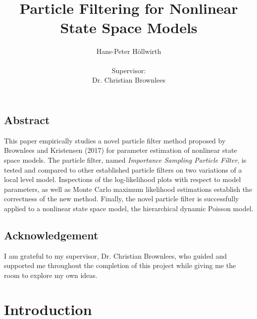 \documentclass[11pt, oneside]{scrreprt}   	%
\title{\textit{}\\\textit{}\\Particle Filtering for Nonlinear\\ State Space Models}
\author{Hans-Peter H{\"o}llwirth \\  \\Supervisor: \\ Dr. Christian Brownlees}
\date{}
\begin{document}
\maketitle

\section*{Abstract}
This paper empirically studies a novel particle filter method proposed by Brownlees and Kristensen (2017) for parameter estimation of nonlinear state space models. 
The particle filter, named \textit{Importance Sampling Particle Filter}, is tested and compared to other established particle filters on two variations of a local level model. 
Inspections of the log-likelihood plots with respect to model parameters, as well as Monte Carlo maximum likelihood estimations establish the correctness of the new method.
Finally, the novel particle filter is successfully applied to a nonlinear state space model, the hierarchical dynamic Poisson model.

\vfill

\section*{Acknowledgement}
I am grateful to my supervisor, Dr. Christian Brownlees, who guided and supported me throughout the completion of this project while giving me the room to explore my own ideas.

\newpage
\setcounter{secnumdepth}{1}
\setcounter{tocdepth}{1}
\tableofcontents
\newpage

\chapter{Introduction}
\label{chp:introduction}
\end{document}
